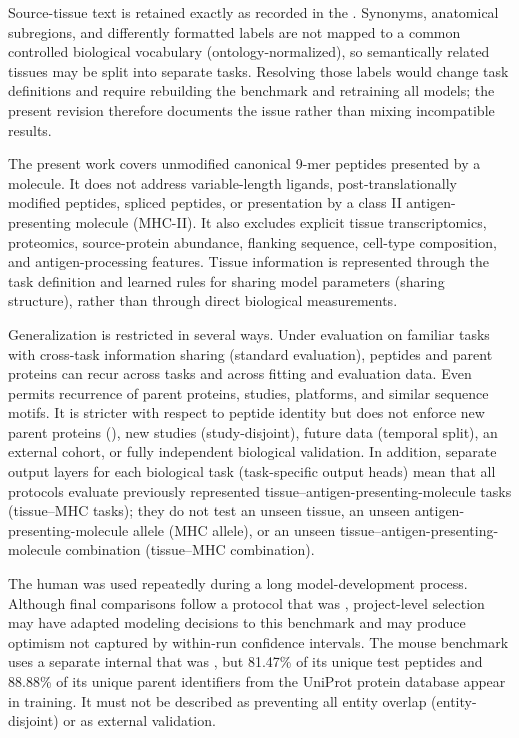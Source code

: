 Source-tissue text is retained exactly as recorded in the \plainIEDB{}. Synonyms, anatomical subregions, and differently formatted labels are not mapped to a common controlled biological vocabulary (ontology-normalized), so semantically related tissues may be split into separate tasks. Resolving those labels would change task definitions and require rebuilding the benchmark and retraining all models; the present revision therefore documents the issue rather than mixing incompatible results.

The present work covers unmodified canonical 9-mer peptides presented by a \plainMHCI{} molecule. It does not address variable-length \plainMHCI{} ligands, post-translationally modified peptides, spliced peptides, or presentation by a class II antigen-presenting molecule (MHC-II). It also excludes explicit tissue transcriptomics, proteomics, source-protein abundance, flanking sequence, cell-type composition, and antigen-processing features. Tissue information is represented through the task definition and learned rules for sharing model parameters (sharing structure), rather than through direct biological measurements.

Generalization is restricted in several ways. Under evaluation on familiar tasks with cross-task information sharing (standard evaluation), peptides and parent proteins can recur across tasks and across fitting and evaluation data. Even \plainPeptideOOF{} permits recurrence of parent proteins, studies, platforms, and similar sequence motifs. It is stricter with respect to peptide identity but does not enforce new parent proteins (\plainProteinDisjoint{}), new studies (study-disjoint), future data (temporal split), an external cohort, or fully independent biological validation. In addition, separate output layers for each biological task (task-specific output heads) mean that all protocols evaluate previously represented tissue--antigen-presenting-molecule tasks (tissue--MHC tasks); they do not test an unseen tissue, an unseen antigen-presenting-molecule allele (MHC allele), or an unseen tissue--antigen-presenting-molecule combination (tissue--MHC combination).

The human \plainFixedTest{} was used repeatedly during a long model-development process. Although final comparisons follow a protocol that was \plainFrozen{}, project-level selection may have adapted modeling decisions to this benchmark and may produce optimism not captured by within-run confidence intervals. The mouse benchmark uses a separate internal \plainFixedTest{} that was \plainFrozen{}, but 81.47\% of its unique test peptides and 88.88\% of its unique parent identifiers from the UniProt protein database appear in training. It must not be described as preventing all entity overlap (entity-disjoint) or as external validation.

